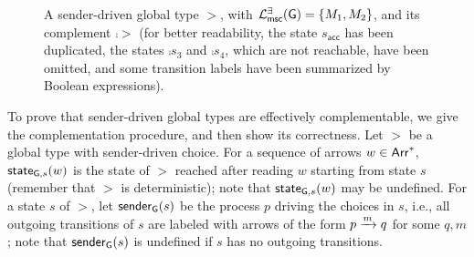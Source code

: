 \begin{figure}[ht]
    \caption{A sender-driven global type $\gt$, with $\existentialmsclanguageof{\gt}=\{M_1,M_2\}$, and its
            complement $\comp{\gt}$ (for better readability, the state $s_{\mathsf{acc}}$ has been duplicated,
            the states $\comp{s_3}$ and $\comp{s_4}$, which are not reachable, have been omitted, and some transition labels have been summarized by Boolean expressions).
            \label{fig:example-of-sender-driven-gt-complementation}}
\end{figure}


To prove that sender-driven global types are effectively complementable, we give the complementation procedure, and then show its correctness.
Let $\gt$ be a global type with sender-driven choice. 
For a sequence of arrows $w\in\Arrows^*$, 
 $\stateof{\gt,s}{w}$ is the state of $\gt$ reached after reading $w$ starting from
state $s$ (remember that $\gt$ is deterministic); note that $\stateof{\gt,s}{w}$ may be
undefined. For a state $s$ of $\gt$, let $\senderof{\gt}{s}$ be the process $p$
driving the choices in $s$, i.e., all outgoing transitions of $s$ are labeled with
arrows of the form $\gtlabel{p}{q}{m}$ for some $q,m$; note that $\senderof{\gt}{s}$
is undefined if $s$ has no outgoing transitions.

